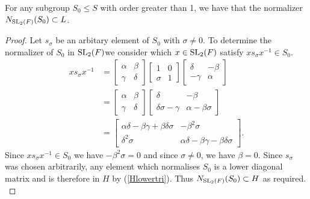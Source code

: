 \begin{proposition}
\label{normalizer_subgroup_S_le_L}
\leanok
 For any subgroup $S_0 \leq S$ with order greater than 1, we have that the normalizer $N_{\operatorname{SL}_2(F)}(S_0) \subset L$.
\end{proposition}
\begin{proof}
    \leanok
Let $s_\sigma$ be an arbitary element of $S_0$ with $\sigma \neq 0$. To determine the normalizer of $S_0$ in $\operatorname{SL}_2(F)$we consider which $x \in \operatorname{SL}_2(F)$ satisfy $x s_\sigma x^{-1} \in S_0$.
\begin{align*} x s_\sigma x^{-1} &= \begin{bmatrix} \alpha & \beta \\ \gamma & \delta \end{bmatrix} \begin{bmatrix} 1 & 0 \\ \sigma & 1 \end{bmatrix} \begin{bmatrix} \delta & - \beta \\ - \gamma & \alpha \end{bmatrix}
\\[1.5ex] &= \begin{bmatrix} \alpha & \beta \\ \gamma & \delta \end{bmatrix} \begin{bmatrix} \delta & - \beta \\ \delta \sigma - \gamma & \alpha - \beta \sigma \end{bmatrix}
\\[1.5ex] &= \begin{bmatrix} \alpha \delta - \beta \gamma + \beta \delta \sigma & - \beta^2  \sigma \\ \delta^2 \sigma & \alpha \delta - \beta \gamma - \beta \delta \sigma \end{bmatrix}.
\end{align*}
Since $x s_\sigma x^{-1} \in S_0$ we have $- \beta^2  \sigma = 0$ and since $\sigma \neq 0$, we have $\beta = 0$. Since $s_\sigma$ was chosen arbitrarily, any element which normalises $S_0$ is a lower diagonal matrix and is therefore in $H$ by (\ref{Hlowertri}). Thus $N_{\operatorname{SL}_2(F)}(S_0) \subset H$ as required. \\
\end{proof}
